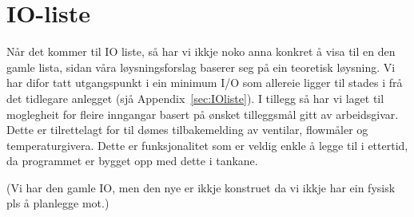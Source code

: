 \section{IO-liste}
\thispagestyle{fancy}

Når det kommer til \gls{IO} liste, så har vi ikkje noko anna konkret å visa til en den gamle lista, sidan våra løysningsforslag baserer seg på ein teoretisk løysning. 
Vi har difor tatt utgangspunkt i ein minimum I/O som allereie ligger til stades i frå det tidlegare anlegget (sjå Appendix~\ref{sec:IOliste}). 
I tillegg så har vi laget til moglegheit for fleire inngangar basert på ønsket tilleggsmål gitt av arbeidsgivar. 
Dette er tilrettelagt for til dømes tilbakemelding av ventilar, flowmåler og temperaturgivera.
Dette er funksjonalitet som er veldig enkle å legge til i ettertid, da programmet er bygget opp med dette i tankane.

(Vi har den gamle IO, men den nye er ikkje konstruet da vi ikkje har ein fysisk pls å planlegge mot.)

\newpage